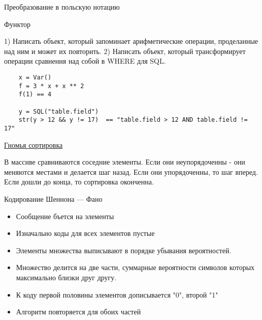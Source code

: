\documentclass{article}
\begin{document}
\LARGE

\begin{center} Преобразование в польскую нотацию \end{center}
\newpage

\begin{center} Функтор \end{center}
1) Написать объект, который запоминает арифметические операции, проделанные над ним 
и может их повторить.
2) Написать объект, который трансформирует операции сравнения над собой в WHERE для SQL.

\begin{lstlisting}
    x = Var()
    f = 3 * x + x ** 2
    f(1) == 4

    y = SQL("table.field")
    str(y > 12 && y != 17)  == "table.field > 12 AND table.field != 17"
\end{lstlisting}
\newpage

\begin{center}
\href{http://ru.wikipedia.org/wiki/%D0%93%D0%BD%D0%BE%D0%BC%D1%8C%D1%8F_%D1%81%D0%BE%D1%80%D1%82%D0%B8%D1%80%D0%BE%D0%B2%D0%BA%D0%B0}{Гномья сортировка}
\end{center}
В массиве сравниваются соседние элементы. 
Если они неупорядоченны - они меняются местами и делается шаг назад.
Если они упорядоченны, то шаг вперед. 
Если дошли до конца, то сортировка оконченна.
\newpage

\begin{center} Кодирование Шеннона — Фано \end{center}
\begin{itemize}
    \item Сообщение бъется на элементы
    \item Изначально коды для всех элементов пустые
    \item Элементы множества выписывают в порядке убывания вероятностей.
    \item Множество делится на две части, суммарные вероятности символов которых
            максимально близки друг другу.
    \item К коду первой половины элементов дописывается "0", второй "1"
    \item Алгоритм повторяется для обоих частей
\end{itemize}
\newpage
\end{document}
